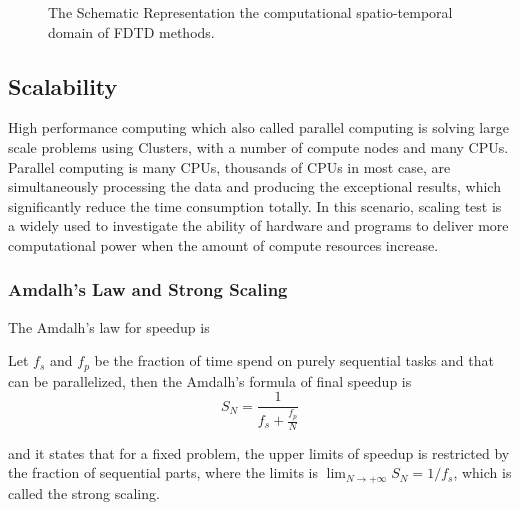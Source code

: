 \begin{figure}[htbp]
  \caption{The Schematic Representation the computational spatio-temporal domain of FDTD methods.}
  \label{FIG:Scheme_FDTD_2D_Heat}
\end{figure}



\subsection{Scalability}
High performance computing which also called 
parallel computing
is solving large scale problems using Clusters, with a number of compute nodes and many CPUs.
Parallel computing is many CPUs, thousands of CPUs in most case, are simultaneously processing the data and 
producing the exceptional results, which significantly reduce the time consumption totally.
In this scenario, scaling test is a widely used to investigate the ability of hardware and programs to 
deliver more computational power when the amount of compute resources increase.

\subsubsection{Amdalh's Law and Strong Scaling}
The Amdalh's law for speedup is 
\begin{theorem}\label{THEO:Amdalh's law}
  Let $f_s$ and $f_p$ be the fraction of time spend on purely sequential tasks and that can be parallelized, then 
  the Amdalh's formula
  \cite{AmdalhsLaw} of final speedup is
  \begin{equation}\label{EQ:Amdalh's law}
    S_N = \frac{1}{f_s + \frac{f_p}{N}}
  \end{equation}
\end{theorem}
and it states that for a fixed problem, the upper limits of speedup is restricted by the fraction of sequential parts, 
where the limits is $\lim_{N\to +\infty} S_N = 1 / f_s$, which is called the strong scaling.


